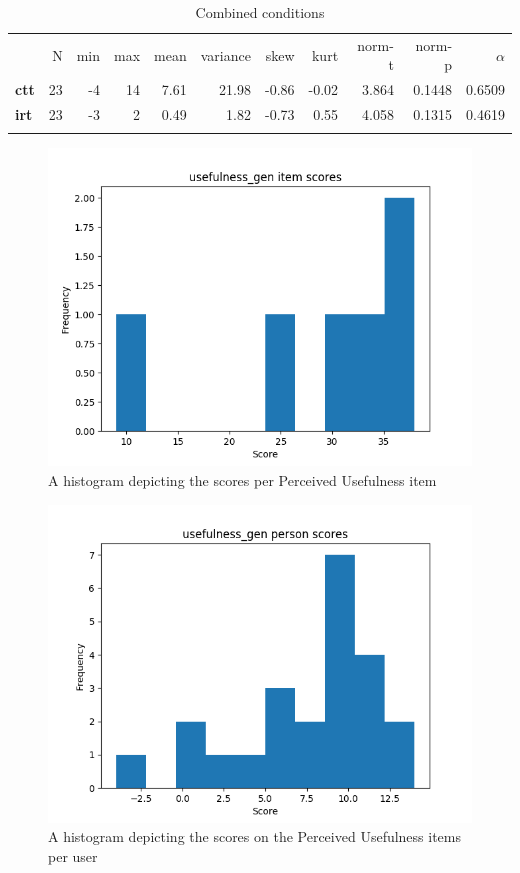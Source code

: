 \begin{longtable}[c]{@{}lrrrrrrrrrr@{}}
\caption{Combined conditions}
\endfirsthead
\toprule\addlinespace
& N & min & max & mean & variance & skew & kurt & norm-t &
norm-p & $\alpha$
\\\addlinespace
\midrule
\textbf{ctt} & 23 & -4 & 14 & 7.61 & 21.98 & -0.86 & -0.02 & 3.864 &
0.1448 & 0.6509
\\\addlinespace
\textbf{irt} & 23 & -3 & 2 & 0.49 & 1.82 & -0.73 & 0.55 & 4.058 & 0.1315
& 0.4619
\\\addlinespace
\bottomrule
    \label{tab:usefulness_gen}
\end{longtable}

\begin{figure}
    \centering
    \includegraphics[width=.7\textwidth]{img/usefulness_gen_diff.png}
    \caption{A histogram depicting the scores per Perceived Usefulness item}
    \label{fig:usefulness_gen_diff}
\end{figure}
\begin{figure}
    \centering
    \includegraphics[width=.7\textwidth]{img/usefulness_gen_abil.png}
    \caption{A histogram depicting the scores on the Perceived Usefulness items per user}
    \label{fig:usefulness_gen_abil}
\end{figure}

